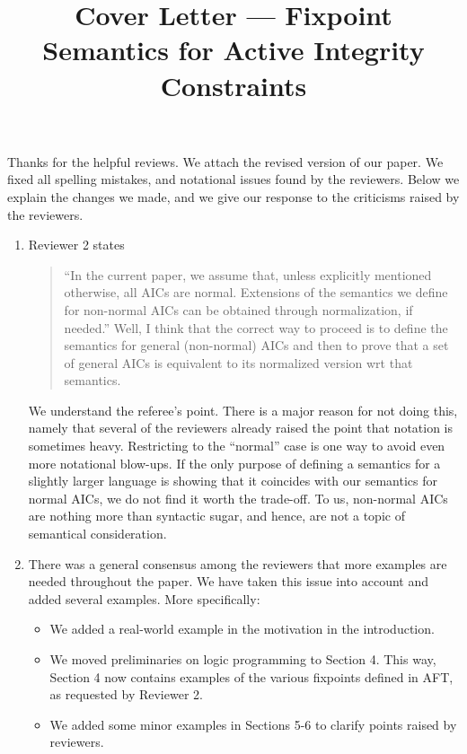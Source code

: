 \documentclass{article}
\title{Cover Letter --- Fixpoint Semantics for Active Integrity Constraints}
\begin{document}
\maketitle
Thanks for the helpful reviews. We attach the revised version of our paper. 
 We fixed all spelling mistakes, and notational issues found by the reviewers.
Below we explain the changes we made, and we give our response to the criticisms raised by the reviewers. 


	\begin{enumerate}
	 \item Reviewer 2 states
	 \begin{quote}
	  ``In the current paper, we assume that, unless explicitly mentioned otherwise, all AICs are normal.
Extensions of the semantics we define for non-normal AICs can be obtained through normalization, if needed.''
Well, I think that the correct way to proceed is to define the semantics for general (non-normal) AICs and
then to prove that a set of general AICs is equivalent to its normalized version wrt that semantics.
	 \end{quote}
         We understand the referee's point. There is a major reason for not doing this, namely that several of the reviewers already raised the point that notation is sometimes heavy. Restricting to the ``normal'' case is one way to avoid even more notational blow-ups. If the only purpose of defining a semantics for a slightly larger language is showing that it coincides with our semantics for normal AICs, we do not find it worth the trade-off. To us, non-normal AICs are nothing more than syntactic sugar, and hence, are not a topic of semantical consideration. 


	 \item There was a general consensus among the reviewers that more examples are needed throughout the paper. We have taken this issue into account and added several examples. More specifically:
	  \begin{itemize}
	  \item We added a real-world example in the motivation in the introduction.
	  \item We moved preliminaries on logic programming to Section 4. This way, Section 4 now contains examples of the various fixpoints defined in AFT, as requested by Reviewer 2. 
	  \item We added some minor examples in Sections 5-6 to clarify points raised by reviewers. 
	  \end{itemize}
	  

\end{enumerate}
\end{document}

